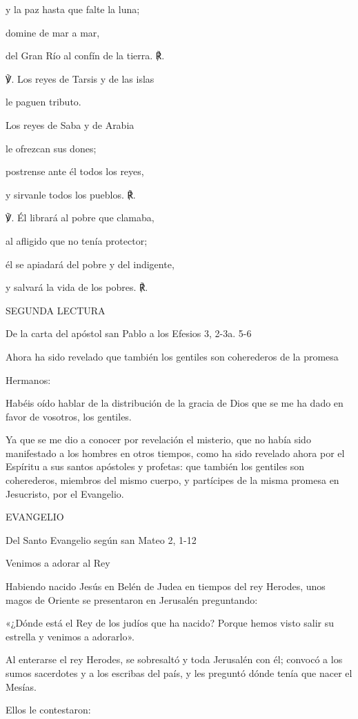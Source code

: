 y la paz hasta que falte la luna;

domine de mar a mar,

del Gran Río al confín de la tierra. ℟.

℣. Los reyes de Tarsis y de las islas

le paguen tributo.

Los reyes de Saba y de Arabia

le ofrezcan sus dones;

postrense ante él todos los reyes,

y sirvanle todos los pueblos. ℟.

℣. Él librará al pobre que clamaba,

al afligido que no tenía protector;

él se apiadará del pobre y del indigente,

y salvará la vida de los pobres. ℟.

SEGUNDA LECTURA

De la carta del apóstol san Pablo a los Efesios 3, 2-3a. 5-6

Ahora ha sido revelado que también los gentiles son coherederos de la
promesa

Hermanos:

Habéis oído hablar de la distribución de la gracia de Dios que se me ha
dado en favor de vosotros, los gentiles.

Ya que se me dio a conocer por revelación el misterio, que no había sido
manifestado a los hombres en otros tiempos, como ha sido revelado ahora
por el Espíritu a sus santos apóstoles y profetas: que también los
gentiles son coherederos, miembros del mismo cuerpo, y partícipes de la
misma promesa en Jesucristo, por el Evangelio.

EVANGELIO

Del Santo Evangelio según san Mateo 2, 1-12

Venimos a adorar al Rey

Habiendo nacido Jesús en Belén de Judea en tiempos del rey Herodes, unos
magos de Oriente se presentaron en Jerusalén preguntando:

«¿Dónde está el Rey de los judíos que ha nacido? Porque hemos visto
salir su estrella y venimos a adorarlo».

Al enterarse el rey Herodes, se sobresaltó y toda Jerusalén con él;
convocó a los sumos sacerdotes y a los escribas del país, y les preguntó
dónde tenía que nacer el Mesías.

Ellos le contestaron:

